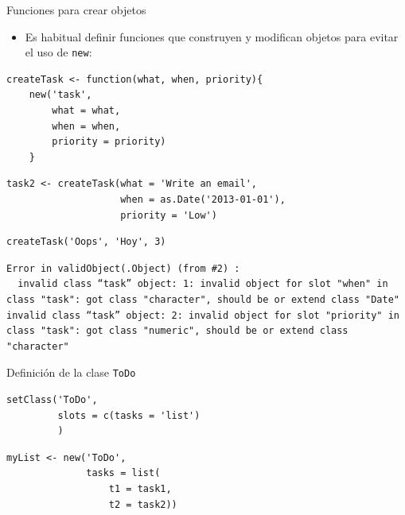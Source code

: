 \documentclass[xcolor={usenames,svgnames,dvipsnames}]{beamer}
\begin{document}
\begin{frame}[fragile,label={sec:orgheadline24}]{Funciones para crear objetos}
 \begin{itemize}
\item Es habitual definir funciones que construyen y modifican objetos
para evitar el uso de \texttt{new}:
\end{itemize}
\lstset{language=R,label= ,caption= ,captionpos=b,numbers=none}
\begin{lstlisting}
createTask <- function(what, when, priority){
    new('task',
        what = what,
        when = when,
        priority = priority)
    }
\end{lstlisting}

\lstset{language=R,label= ,caption= ,captionpos=b,numbers=none}
\begin{lstlisting}
task2 <- createTask(what = 'Write an email',
                    when = as.Date('2013-01-01'),
                    priority = 'Low')
\end{lstlisting}

\lstset{language=R,label= ,caption= ,captionpos=b,numbers=none}
\begin{lstlisting}
createTask('Oops', 'Hoy', 3)
\end{lstlisting}

\begin{verbatim}
Error in validObject(.Object) (from #2) : 
  invalid class “task” object: 1: invalid object for slot "when" in class "task": got class "character", should be or extend class "Date"
invalid class “task” object: 2: invalid object for slot "priority" in class "task": got class "numeric", should be or extend class "character"
\end{verbatim}
\end{frame}

\begin{frame}[fragile,label={sec:orgheadline25}]{Definición de la clase \texttt{ToDo}}
 \lstset{language=R,label= ,caption= ,captionpos=b,numbers=none}
\begin{lstlisting}
setClass('ToDo',
         slots = c(tasks = 'list')
         )
\end{lstlisting}

\lstset{language=R,label= ,caption= ,captionpos=b,numbers=none}
\begin{lstlisting}
myList <- new('ToDo',
              tasks = list(
                  t1 = task1,
                  t2 = task2))
\end{lstlisting}
\end{frame}
\end{document}
